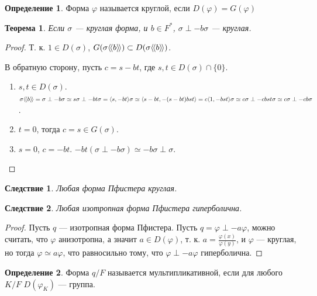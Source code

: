 \documentclass{article}
\newenvironment{enum}[2][\parindent]{\begin{enumerate}[nosep, wide, labelindent = #1, label = #2]}{\end{enumerate}}
\newtheorem*{theorem}{Теорема}
\newtheorem*{corollary}{Следствие}
\theoremstyle{definition}
\newtheorem*{definition}{Определение}
\theoremstyle{remark}
\newcommand{\llangle}{\langle \hspace{-.5mm} \langle}
\newcommand{\rrangle}{\rangle \hspace{-.5mm} \rangle}
\begin{document}
\begin{definition}
    Форма $\varphi$ называется круглой, если $D(\varphi) = G(\varphi)$
\end{definition}

\begin{theorem}
    Если $\sigma$ --- круглая форма, и $b \in F^*$, $\sigma \perp -b\sigma$ --- круглая.
\end{theorem}
\begin{proof}
    Т. к. $1 \in D(\sigma)$, $G(\sigma\llangle b \rrangle) \subset D(\sigma\llangle b \rrangle)$.

    В обратную сторону, пусть $c = s - bt$, где $s, t \in D(\sigma) \cap \{0\}$.
    \begin{enum}{\arabic*)}
        \item $s, t \in D(\sigma)$.
        $\sigma \llangle b \rrangle = \sigma \perp -b\sigma \simeq s\sigma \perp -bt \sigma = \langle s, -bt \rangle \sigma \simeq \langle s - bt, -(s -bt)bst \rangle = c \langle 1, -bst \rangle \sigma \simeq c \sigma \perp -cbst\sigma \simeq c \sigma \perp -cb \sigma$.
        \item $t = 0$, тогда $c = s \in G(\sigma)$.
        \item $s = 0$, $c = -bt$. $-bt(\sigma \perp -b\sigma) \simeq -b\sigma \perp \sigma$.
    \end{enum}
\end{proof}

\begin{corollary}
    Любая форма Пфистера круглая.
\end{corollary}

\begin{corollary}
    Любая изотропная форма Пфистера гиперболична.
\end{corollary}
\begin{proof}
    Пусть $q$ --- изотропная форма Пфистера. Пусть $q = \varphi \perp -a\varphi$, можно считать, что $\varphi$ анизотропна, а значит $a \in D(\varphi)$, т. к. $a = \frac{\varphi(x)}{\varphi(y)}$, и $\varphi$ --- круглая, но тогда $\varphi \simeq a\varphi$, что равносильно тому, что $\varphi \perp -a\varphi$ гиперболична.
\end{proof}

\begin{definition}
    Форма $q / F$ называется мультипликативной, если для любого $K / F$ $D(\varphi_K)$ --- группа.
\end{definition}
\end{document}
